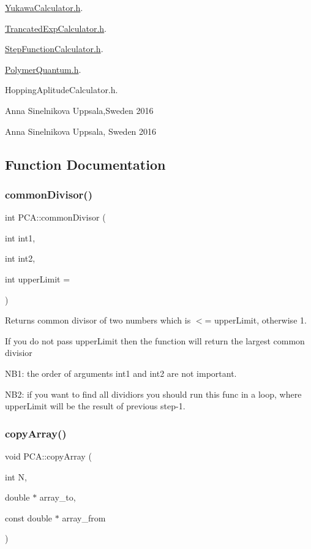 \hyperlink{_yukawa_calculator_8h}{Yukawa\+Calculator.\+h}.

\hyperlink{_trancated_exp_calculator_8h}{Trancated\+Exp\+Calculator.\+h}.

\hyperlink{_step_function_calculator_8h}{Step\+Function\+Calculator.\+h}.

\hyperlink{_polymer_quantum_8h}{Polymer\+Quantum.\+h}.

Hopping\+Aplitude\+Calculator.\+h.

Anna Sinelnikova Uppsala,Sweden 2016

Anna Sinelnikova Uppsala, Sweden 2016 

\subsection{Function Documentation}
\hypertarget{namespace_p_c_a_a13d2c7cbde32faf05da77e81c6396b92}{}\label{namespace_p_c_a_a13d2c7cbde32faf05da77e81c6396b92} 
\subsubsection{\texorpdfstring{common\+Divisor()}{commonDivisor()}}
{\footnotesize\ttfamily int P\+C\+A\+::common\+Divisor (\begin{DoxyParamCaption}\item[{int}]{int1,  }\item[{int}]{int2,  }\item[{int}]{upper\+Limit = {} }\end{DoxyParamCaption})}



Returns common divisor of two numbers which is $<$= upper\+Limit, otherwise 1. 

If you do not pass upper\+Limit then the function will return the largest common divisior

N\+B1\+: the order of arguments int1 and int2 are not important.

N\+B2\+: if you want to find all dividiors you should run this func in a loop, where upper\+Limit will be the result of previous step-\/1. \hypertarget{namespace_p_c_a_ac0ca09771710ce44c06d3f5f4402fd80}{}\label{namespace_p_c_a_ac0ca09771710ce44c06d3f5f4402fd80} 
\subsubsection{\texorpdfstring{copy\+Array()}{copyArray()}\hspace{0.1cm}{\footnotesize\ttfamily [1/8]}}
{\footnotesize\ttfamily void P\+C\+A\+::copy\+Array (\begin{DoxyParamCaption}\item[{int}]{N,  }\item[{double $\ast$}]{array\+\_\+to,  }\item[{const double $\ast$}]{array\+\_\+from }\end{DoxyParamCaption})}



